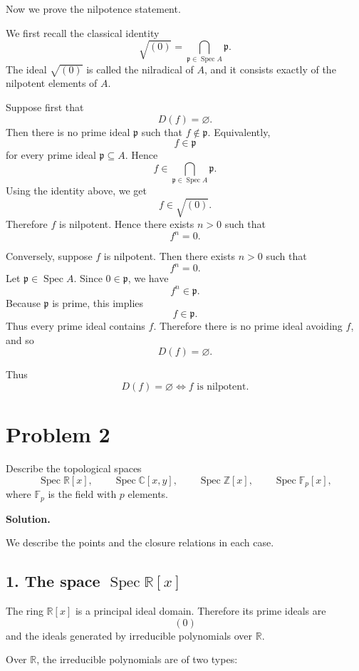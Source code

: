 \documentclass[12pt,a4paper]{article}
\newcommand{\Spec}{\operatorname{Spec}}
\begin{document}
	\bigskip
	
	Now we prove the nilpotence statement.
	
	We first recall the classical identity
	\[
	\sqrt{(0)}
	=
	\bigcap_{\mathfrak p\in \Spec A}\mathfrak p.
	\]
	The ideal \(\sqrt{(0)}\) is called the nilradical of \(A\), and it consists
	exactly of the nilpotent elements of \(A\).
	
	Suppose first that
	\[
	D(f)=\varnothing.
	\]
	Then there is no prime ideal \(\mathfrak p\) such that \(f\notin \mathfrak p\).
	Equivalently,
	\[
	f\in \mathfrak p
	\]
	for every prime ideal \(\mathfrak p\subseteq A\). Hence
	\[
	f\in \bigcap_{\mathfrak p\in \Spec A}\mathfrak p.
	\]
	Using the identity above, we get
	\[
	f\in \sqrt{(0)}.
	\]
	Therefore \(f\) is nilpotent. Hence there exists \(n>0\) such that
	\[
	f^n=0.
	\]
	
	Conversely, suppose \(f\) is nilpotent. Then there exists \(n>0\) such that
	\[
	f^n=0.
	\]
	Let \(\mathfrak p\in \Spec A\). Since \(0\in \mathfrak p\), we have
	\[
	f^n\in \mathfrak p.
	\]
	Because \(\mathfrak p\) is prime, this implies
	\[
	f\in \mathfrak p.
	\]
	Thus every prime ideal contains \(f\). Therefore there is no prime ideal avoiding
	\(f\), and so
	\[
	D(f)=\varnothing.
	\]
	
	Thus
	\[
	\boxed{
		D(f)=\varnothing
		\iff
		f\text{ is nilpotent}.
	}
	\]
	
	\section*{Problem 2}
	
	Describe the topological spaces
	\[
	\Spec \mathbb R[x],
	\qquad
	\Spec \mathbb C[x,y],
	\qquad
	\Spec \mathbb Z[x],
	\qquad
	\Spec \mathbb F_p[x],
	\]
	where \(\mathbb F_p\) is the field with \(p\) elements.
	
	\bigskip
	
	\textbf{Solution.}
	
	We describe the points and the closure relations in each case.
	
	\subsection*{1. The space \(\Spec \mathbb R[x]\)}
	
	The ring \(\mathbb R[x]\) is a principal ideal domain. Therefore its prime ideals
	are
	\[
	(0)
	\]
	and the ideals generated by irreducible polynomials over \(\mathbb R\).
	
	Over \(\mathbb R\), the irreducible polynomials are of two types:
	
\end{document}
